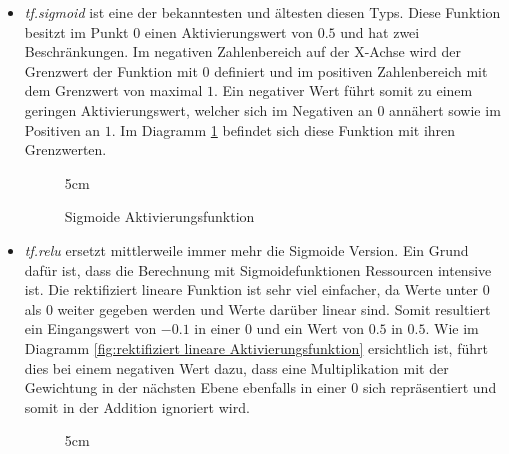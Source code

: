 \begin{itemize}
	\item \textit{tf.sigmoid} ist eine der bekanntesten und ältesten diesen Typs.
	Diese Funktion besitzt im Punkt $0$ einen Aktivierungswert von $0.5$ und hat zwei Beschränkungen. 
	Im negativen Zahlenbereich auf der X-Achse wird der Grenzwert der Funktion mit $0$ definiert und im positiven Zahlenbereich mit dem Grenzwert von maximal $1$. 
	Ein negativer Wert führt somit zu einem geringen Aktivierungswert, welcher sich im Negativen an $0$ annähert sowie im Positiven an $1$.
	Im Diagramm \ref{fig:Sigmoide Aktivierungsfunktion} befindet sich diese Funktion mit ihren Grenzwerten. 
\begin{figure}
	\centering
	\resizebox {\linewidth} {5cm} {
	}
	\caption{Sigmoide Aktivierungsfunktion}
	\label{fig:Sigmoide Aktivierungsfunktion}
\end{figure}
	\item \textit{tf.relu} ersetzt mittlerweile immer mehr die Sigmoide Version. 
	Ein Grund dafür ist, dass die Berechnung mit Sigmoidefunktionen Ressourcen intensive ist. 
	Die rektifiziert lineare Funktion ist sehr viel einfacher, da Werte unter $0$ als $0$ weiter gegeben werden und Werte darüber linear sind. 
	Somit resultiert ein Eingangswert von $-0.1$ in einer $0$ und ein Wert von $0.5$ in $0.5$.
	Wie im Diagramm \ref{fig:rektifiziert lineare Aktivierungsfunktion} ersichtlich ist, führt dies bei einem negativen Wert dazu, dass eine Multiplikation mit der Gewichtung in der nächsten Ebene ebenfalls in einer $0$ sich repräsentiert und somit in der Addition ignoriert wird.
\begin{figure}
	\centering
	\resizebox {\linewidth} {5cm} {
	}
\end{figure}
\end{itemize}
